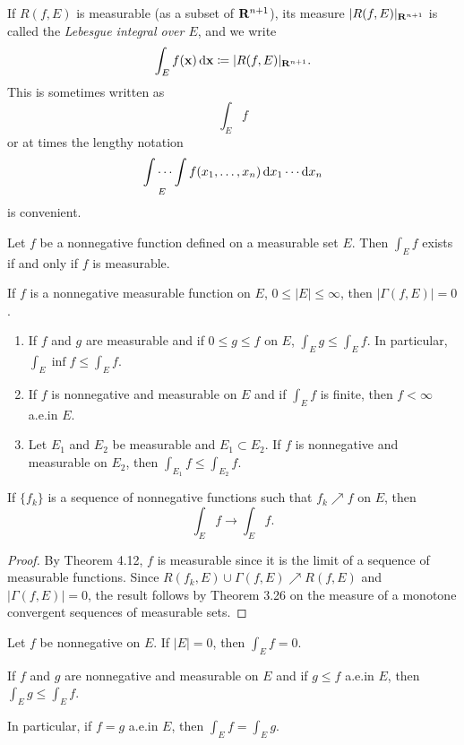 If $R(f,E)$ is measurable (as a subset of $\mathbf{R}^{n+1}$), its measure
$|R(f,E)|_{\mathbf{R}^{n+1}}$ is called the \emph{Lebesgue integral over $E$},
and we write
\begin{equation}
\label{eq:lebesgue-integral}
\int_E f(\mathbf{x})\mathop{}\!\mathrm{d}\mathbf{x}\coloneqq|R(f,E)|_{\mathbf{R}^{n+1}}.
\end{equation}
This is sometimes written as
\[
\int_E f
\]
or at times the lengthy notation
\[
\idotsint\limits_{E} f(x_1,\dotsc,x_n)\mathop{}\!\mathrm{d} x_1\cdots\mathop{}\!\mathrm{d} x_n
\]
is convenient.
\begin{theorem*}[5.1]
Let $f$ be a nonnegative function defined on a measurable set $E$. Then
$\int_E f$ exists if and only if $f$ is measurable.
\end{theorem*}
\begin{lemma*}[5.3]
If $f$ is a nonnegative measurable function on $E$, $0\leq |E|\leq\infty$,
then $|\Gamma(f,E)|=0$.
\end{lemma*}
\begin{theorem*}[5.5]
\begin{enumerate}[label=\textnormal{(\roman*)}]
\item If $f$ and $g$ are measurable and if $0\leq g\leq f$ on $E$, $\int_E
  g\leq\int_E f$. In particular, $\int_E\inf f\leq\int_E f$.
\item If $f$ is nonnegative and measurable on $E$ and if $\int_E f$ is
  finite, then $f<\infty$ a.e.\@ in $E$.
\item Let $E_1$ and $E_2$ be measurable and $E_1\subset E_2$. If $f$ is
  nonnegative and measurable on $E_2$, then $\int_{E_1} f\leq\int_{E_2}f$.
\end{enumerate}
\end{theorem*}
\begin{theorem*}
If $\{f_k\}$ is a sequence of nonnegative functions such that $f_k\nearrow
f$ on $E$, then
\[
\int_E f\to\int_E f.
\]
\end{theorem*}
\begin{proof}
By Theorem 4.12, $f$ is measurable since it is the limit of a sequence of
measurable functions. Since $R(f_k,E)\cup\Gamma(f,E)\nearrow R(f,E)$ and
$|\Gamma(f,E)|=0$, the result follows by Theorem 3.26 on the measure of a
monotone convergent sequences of measurable sets.
\end{proof}
\begin{theorem*}[5.9]
Let $f$ be nonnegative on $E$. If $|E|=0$, then $\int_E f=0$.
\end{theorem*}
\begin{theorem*}[5.10]
If $f$ and $g$ are nonnegative and measurable on $E$ and if $g\leq f$
a.e.\@ in $E$, then $\int_E g\leq\int_E f$.

In particular, if $f=g$ a.e.\@ in $E$, then $\int_E f=\int_E g$.
\end{theorem*}
